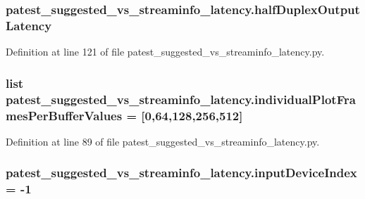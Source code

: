 \subsubsection[{\texorpdfstring{half\+Duplex\+Output\+Latency}{halfDuplexOutputLatency}}]{\setlength{\rightskip}{0pt plus 5cm}patest\+\_\+suggested\+\_\+vs\+\_\+streaminfo\+\_\+latency.\+half\+Duplex\+Output\+Latency}\hypertarget{namespacepatest__suggested__vs__streaminfo__latency_ac3375286fcd2d8da8a95235dd54aaef0}{}\label{namespacepatest__suggested__vs__streaminfo__latency_ac3375286fcd2d8da8a95235dd54aaef0}


Definition at line 121 of file patest\+\_\+suggested\+\_\+vs\+\_\+streaminfo\+\_\+latency.\+py.

\subsubsection[{\texorpdfstring{individual\+Plot\+Frames\+Per\+Buffer\+Values}{individualPlotFramesPerBufferValues}}]{\setlength{\rightskip}{0pt plus 5cm}list patest\+\_\+suggested\+\_\+vs\+\_\+streaminfo\+\_\+latency.\+individual\+Plot\+Frames\+Per\+Buffer\+Values = \mbox{[}0,64,128,256,512\mbox{]}}\hypertarget{namespacepatest__suggested__vs__streaminfo__latency_ac671a6bf00bbe9c085d7e3aa05e33bb5}{}\label{namespacepatest__suggested__vs__streaminfo__latency_ac671a6bf00bbe9c085d7e3aa05e33bb5}


Definition at line 89 of file patest\+\_\+suggested\+\_\+vs\+\_\+streaminfo\+\_\+latency.\+py.

\subsubsection[{\texorpdfstring{input\+Device\+Index}{inputDeviceIndex}}]{ patest\+\_\+suggested\+\_\+vs\+\_\+streaminfo\+\_\+latency.\+input\+Device\+Index = -\/1}\hypertarget{namespacepatest__suggested__vs__streaminfo__latency_ad74185b92e44993730a14a8847776c4e}{}\label{namespacepatest__suggested__vs__streaminfo__latency_ad74185b92e44993730a14a8847776c4e}



